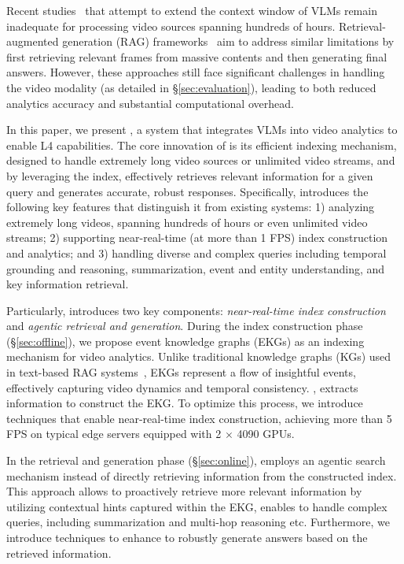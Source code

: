 Recent studies~\cite{shen2024longvu, shen2025longvita, wang2025adaretake} that attempt to extend the context window of VLMs remain inadequate for processing video sources spanning hundreds of hours. Retrieval-augmented generation (RAG) frameworks~\cite{edge2024graphrag, guo2024lightrag, fan2025minirag, lazygraphrag2024} aim to address similar limitations by first retrieving relevant frames from massive contents and then generating final answers. However, these approaches still face significant challenges in handling the video modality (as detailed in \S\ref{sec:evaluation}), leading to both reduced analytics accuracy and substantial computational overhead.


In this paper, we present \sysname, a system that integrates VLMs into video analytics to enable L4 capabilities. The core innovation of \sysname is its efficient indexing mechanism, designed to handle extremely long video sources or unlimited video streams, and by leveraging the index, \sysname effectively retrieves relevant information for a given query and generates accurate, robust responses. Specifically, \sysname introduces the following key features that distinguish it from existing systems: 1) analyzing extremely long videos, spanning hundreds of hours or even unlimited video streams; 2) supporting near-real-time (\eg at more than 1 FPS) index construction and analytics; and 3) handling diverse and complex queries including temporal grounding and reasoning, summarization, event and entity understanding, and key information retrieval.




Particularly, \sysname introduces two key components: \emph{near-real-time index construction} and \emph{agentic retrieval and generation}. During the index construction phase (\S\ref{sec:offline}), we propose event knowledge graphs (EKGs) as an indexing mechanism for video analytics. Unlike traditional knowledge graphs (KGs) used in text-based RAG systems~\cite{edge2024graphrag, guo2024lightrag, lazygraphrag2024}, EKGs represent a flow of insightful events, effectively capturing video dynamics and temporal consistency. , \sysname extracts information to construct the EKG. To optimize this process, we introduce techniques that enable near-real-time index construction, achieving more than 5 FPS on typical edge servers equipped with 2 $\times$ 4090 GPUs.


In the retrieval and generation phase (\S\ref{sec:online}), \sysname employs an agentic search mechanism instead of directly retrieving information from the constructed index. This approach allows \sysname to proactively retrieve more relevant information by utilizing contextual hints captured within the EKG, enables \sysname to handle complex queries, including summarization and multi-hop reasoning etc. Furthermore, we introduce techniques to enhance \sysname to robustly generate answers based on the retrieved information.



